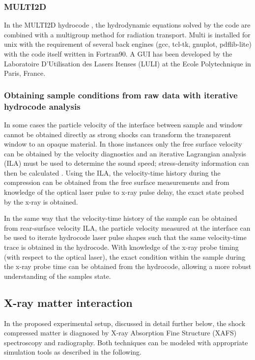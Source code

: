\documentclass[10pt]{scrartcl}
\begin{document}
\subsubsection{MULTI2D}
In the MULTI2D hydrocode \cite{Ramis2009}, the hydrodynamic equations solved by the code are combined with a multigroup method for radiation transport. Multi is installed for unix with the requirement of several back engines (gcc, tcl-tk, gnuplot, pdflib-lite) with the code itself written in Fortran90. A GUI has been developed by the Laboratoire D'Utilisation des Lasers Itenses (LULI) at the Ecole Polytechnique in Paris, France.

\subsubsection{Obtaining sample conditions from raw data with iterative hydrocode analysis}
In some cases the particle velocity of the interface between sample and window cannot be obtained directly as strong shocks can transform the transparent window to an opaque
material. In those instances only the free surface velocity can be obtained by the velocity diagnostics and an iterative Lagrangian analysis (ILA) must be used to determine the sound
speed; stress-density information can then be calculated \cite{Rothman2006}.  Using the ILA, the velocity-time history during the compression can be obtained from the free surface measurements and from knowledge of the optical laser pulse to x-ray pulse delay, the exact state probed by the x-ray is obtained.

In the same way that the velocity-time history of the sample can be obtained
from rear-surface velocity ILA, the particle velocity measured at the interface
can be used to iterate hydrocode laser pulse shapes such that the same
velocity-time trace is obtained in the hydrocode. With knowledge of the x-ray probe timing (with respect to the optical laser), the exact condition within the sample during the x-ray probe time can be obtained from the hydrocode, allowing a more robust understanding of the samples state.

\subsection{X-ray matter interaction}
In the proposed experimental setup, discussed in detail further below, the shock compressed matter is diagnosed by
X-ray Absorption Fine Structure (XAFS) spectroscopy and radiography. Both techniques can be modeled with appropriate simulation tools as
described in the following.
\end{document}
